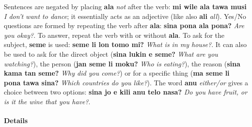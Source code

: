 \documentclass[10pt,a4paper]{article}
\begin{document}
Sentences are negated by placing \textbf{ala} \textit{not} after the verb: \textbf{mi wile ala tawa musi} \textit{I don't want to dance}; it essentially acts as an adjective (like also \textbf{ali} \textit{all}). Yes/No questions are formed by repeating the verb after \textbf{ala}: \textbf{sina pona ala pona?} \textit{Are you okay?}. To answer, repeat the verb with or without \textbf{ala}. To ask for the subject, \textbf{seme} is used: \textbf{seme li lon tomo mi?} \textit{What is in my house?}. It can also be used to ask for the direct object (\textbf{sina lukin e seme?} \textit{What are you watching?}), the person (\textbf{jan seme li moku?} \textit{Who is eating?}), the reason (\textbf{sina kama tan seme?} \textit{Why did you come?}) or for a specific thing (\textbf{ma seme li pona tawa sina?} \textit{Which countries do you like?}). The word \textbf{anu} \textit{either/or} gives a choice between two options: \textbf{sina jo e kili anu telo nasa?} \textit{Do you have fruit, or is it the wine that you have?}.

\paragraph{Details}
\end{document}
